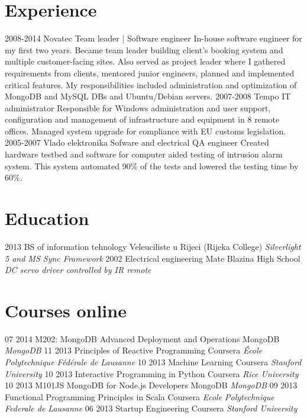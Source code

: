 \documentclass[]{cv}
\begin{document}
\section{Experience}

\begin{entrylist}
  \entry
    {2008-2014}
    {Novatec}
    {Team leader | Software engineer}
    {In-house software engineer for my first two years. Became team leader building client's booking system and multiple customer-facing sites. Also served as project leader where I gathered requirements from clients, mentored junior engineers, planned and implemented critical features. My responsibilities included administration and optimization of MongoDB and MySQL DBs and Ubuntu/Debian servers.}
  \entry
    {2007-2008}
    {Tempo}
    {IT administrator}
    {Responsible for Windows administration and user support, configuration and management of infrastructure and equipment in 8 remote offices. Managed system upgrade for compliance with EU customs legislation.}
  \entry
    {2005-2007}
    {Vlado elektronika}
    {Sofware and electrical QA engineer}
    {Created hardware testbed and software for computer aided testing of intrusion alarm system. This system automated 90\% of the tests and lowered the testing time by 60\%.}
\end{entrylist}

\section{Education}

\begin{entrylist}
  \entry
    {2013}
    {BS of information tehnology}
    {Veleuciliste u Rijeci (Rijeka College)}
    {\emph{Silverlight 5 and MS Sync Framework}}
  \entry
    {2002}
    {Electrical engineering}
    {Mate Blazina High School}
    {\emph{DC servo driver controlled by IR remote}}
\end{entrylist}
\section{Courses online}
\begin{entrylist}
  \entry
    {07 2014} 
    {M202: MongoDB Advanced Deployment and Operations}
    {MongoDB}
    {\emph{MongoDB}}
  \entry
    {11 2013}
    {Principles of Reactive Programming}
    {Coursera}
    {\emph{École Polytechnique Fédérale de Lausanne}}
  \entry
    {10 2013}
    {Machine Learning} 
    {Coursera}
    {\emph{Stanford University}}
  \entry
    {10 2013}
    {Interactive Programming in Python}
    {Coursera}
    {\emph{Rice University}}
  \entry
    {10 2013}
    {M101JS MongoDB for Node.js Developers}
    {MongoDB}
    {\emph{MongoDB}}
  \entry
    {09 2013}
    {Functional Programming Principles in Scala}
    {Coursera}
    {\emph{Ecole Polytechnique Federale de Lausanne}}
  \entry
    {06 2013}
    {Startup Engineering}
    {Coursera}
    {\emph{Stanford University}}
\end{entrylist}
\end{document}
